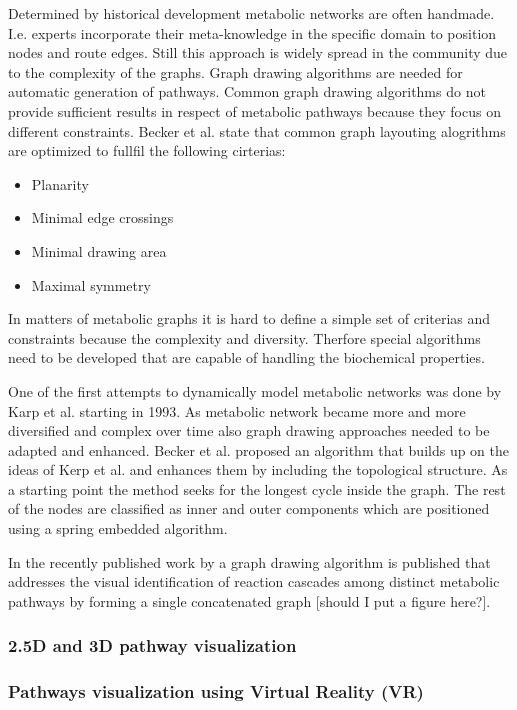 Determined by historical development metabolic networks are often handmade. I.e. experts incorporate their meta-knowledge in the specific domain to position nodes and route edges. Still this approach is widely spread in the community due to the complexity of the graphs. Graph drawing algorithms are needed for automatic generation of pathways. Common graph drawing algorithms do not provide sufficient results in respect of metabolic pathways because they focus on different constraints\cite{Becker2001}. Becker et al. state that common graph layouting alogrithms are optimized to fullfil the following cirterias:
\begin{itemize}
 \item Planarity
 \item Minimal edge crossings
 \item Minimal drawing area
 \item Maximal symmetry
\end{itemize}
In matters of metabolic graphs it is hard to define a simple set of criterias and constraints because the complexity and diversity. Therfore special algorithms need to be developed that are capable of handling the biochemical properties.

One of the first attempts to dynamically model metabolic networks was done by Karp et al. starting in 1993\cite{Karp1993, Karp1994, Karp1994a}. As metabolic network became more and more diversified and complex over time also graph drawing approaches needed to be adapted and enhanced. Becker et al. proposed an algorithm that builds up on the ideas of Kerp et al. and enhances them by including the topological structure. As a starting point the method seeks for the longest cycle inside the graph. The rest of the nodes are classified as inner and outer components which are positioned using a spring embedded algorithm.

In the recently published work by \cite{Bourqui2006} a graph drawing algorithm is published that addresses the visual identification of reaction cascades among distinct metabolic pathways by forming a single concatenated graph [should I put a figure here?].

\subsubsection{2.5D and 3D pathway visualization}


\subsubsection{Pathways visualization using Virtual Reality (VR)}

